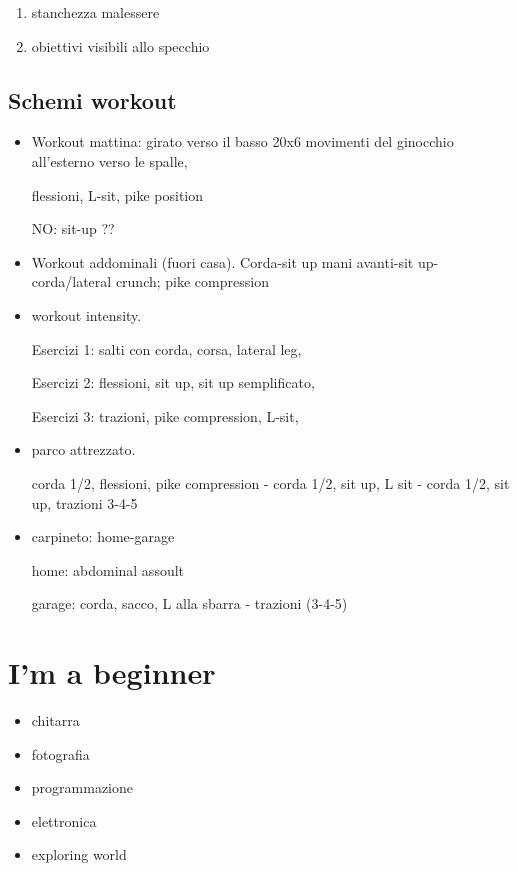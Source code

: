 \begin{enumerate}

\item stanchezza malessere

\item obiettivi visibili allo specchio

\end{enumerate}

\subsection{Schemi workout}

\begin{itemize}

\item Workout mattina: girato verso il basso 20x6 movimenti del ginocchio all'esterno verso le spalle,

flessioni, L-sit, pike position

NO: sit-up ??

\item Workout addominali (fuori casa). Corda-sit up mani avanti-sit up-corda/lateral crunch; pike compression

\item workout intensity.

Esercizi 1: salti con corda, corsa, lateral leg, 

Esercizi 2: flessioni, sit up, sit up semplificato,

Esercizi 3: trazioni, pike compression, L-sit, 

\item parco attrezzato.

corda 1/2, flessioni, pike compression - corda 1/2, sit up, L sit - corda 1/2, sit up, trazioni 3-4-5

\item carpineto: home-garage

home: abdominal assoult

garage: corda, sacco, L alla sbarra - trazioni (3-4-5)

\end{itemize} 

\section{I'm a beginner}

\begin{itemize}

\item chitarra

\item fotografia

\item programmazione

\item elettronica

\item exploring world

\end{itemize}